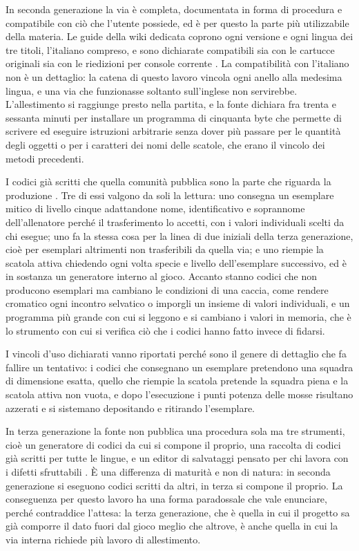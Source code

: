 In seconda generazione la via è completa, documentata in forma di procedura e compatibile con ciò che l'utente possiede, ed è per questo la parte più utilizzabile della materia. Le guide della wiki dedicata coprono ogni versione e ogni lingua dei tre titoli, l'italiano compreso, e sono dichiarate compatibili sia con le cartucce originali sia con le riedizioni per console corrente \cite{timovm-ace-gen2}. La compatibilità con l'italiano non è un dettaglio: la catena di questo lavoro vincola ogni anello alla medesima lingua, e una via che funzionasse soltanto sull'inglese non servirebbe. L'allestimento si raggiunge presto nella partita, e la fonte dichiara fra trenta e sessanta minuti per installare un programma di cinquanta byte che permette di scrivere ed eseguire istruzioni arbitrarie senza dover più passare per le quantità degli oggetti o per i caratteri dei nomi delle scatole, che erano il vincolo dei metodi precedenti.

I codici già scritti che quella comunità pubblica sono la parte che riguarda la produzione \cite{glitchcity-mailwriter}. Tre di essi valgono da soli la lettura: uno consegna un esemplare mitico di livello cinque adattandone nome, identificativo e soprannome dell'allenatore perché il trasferimento lo accetti, con i valori individuali scelti da chi esegue; uno fa la stessa cosa per la linea di due iniziali della terza generazione, cioè per esemplari altrimenti non trasferibili da quella via; e uno riempie la scatola attiva chiedendo ogni volta specie e livello dell'esemplare successivo, ed è in sostanza un generatore interno al gioco. Accanto stanno codici che non producono esemplari ma cambiano le condizioni di una caccia, come rendere cromatico ogni incontro selvatico o imporgli un insieme di valori individuali, e un programma più grande con cui si leggono e si cambiano i valori in memoria, che è lo strumento con cui si verifica ciò che i codici hanno fatto invece di fidarsi.

I vincoli d'uso dichiarati vanno riportati perché sono il genere di dettaglio che fa fallire un tentativo: i codici che consegnano un esemplare pretendono una squadra di dimensione esatta, quello che riempie la scatola pretende la squadra piena e la scatola attiva non vuota, e dopo l'esecuzione i punti potenza delle mosse risultano azzerati e si sistemano depositando e ritirando l'esemplare.

In terza generazione la fonte non pubblica una procedura sola ma tre strumenti, cioè un generatore di codici da cui si compone il proprio, una raccolta di codici già scritti per tutte le lingue, e un editor di salvataggi pensato per chi lavora con i difetti sfruttabili \cite{ace-archive}. È una differenza di maturità e non di natura: in seconda generazione si eseguono codici scritti da altri, in terza si compone il proprio. La conseguenza per questo lavoro ha una forma paradossale che vale enunciare, perché contraddice l'attesa: la terza generazione, che è quella in cui il progetto sa già comporre il dato fuori dal gioco meglio che altrove, è anche quella in cui la via interna richiede più lavoro di allestimento.

